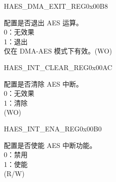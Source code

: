 \begin{register}{H}{AES\_DMA\_EXIT\_REG}{0x00B8}\label{regdesc:AESDMAEXITREG}
%
%
\regnewline%
\begin{regdesc}\begin{reglist}
\item [AES\_DMA\_EXIT] 配置是否退出 AES 运算。\\
0：无效果\\
1：退出\\
仅在 DMA-AES 模式下有效。(WO)
\end{reglist}\end{regdesc}
\end{register}


\begin{register}{H}{AES\_INT\_CLEAR\_REG}{0x00AC}\label{regdesc:AESINTCLEARREG}
%
%
\regnewline%
\begin{regdesc}\begin{reglist}
\item [AES\_INT\_CLEAR] 配置是否清除 AES 中断。\\
0：无效果\\
1：清除\\
(WO)
\end{reglist}\end{regdesc}
\end{register}


\begin{register}{H}{AES\_INT\_ENA\_REG}{0x00B0}\label{regdesc:AESINTENAREG}
%
%
\regnewline%
\begin{regdesc}\begin{reglist}
\item [AES\_INT\_ENA] 配置是否使能 AES 中断功能。\\
0：禁用\\
1：使能\\
(R/W)
\end{reglist}\end{regdesc}
\end{register}
